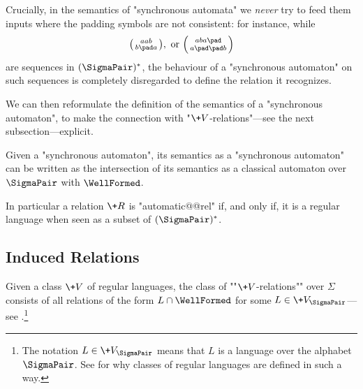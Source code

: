\begin{remark}
	\AP\label{rk:semantic}
	Crucially, in the semantics of "synchronous automata" we \emph{never}
	try to feed them inputs where the padding symbols are not consistent: for instance, while
	\[
		\pair{aab}{b\pad a},
		\text{ or }
		\pair{aba\pad}{a\pad\pad b}	
	\]
	are sequences in $(\SigmaPair)^*$, the behaviour of a "synchronous automaton"
	on such sequences is completely disregarded to define the relation it recognizes. 
\end{remark}

We can then reformulate the definition of the semantics of a "synchronous automaton",
to make the connection with "$\+V$-relations"---see the next subsection---explicit.

\begin{fact}
	\AP\label{fact:synchronous-is-regular}
	Given a "synchronous automaton", its semantics as a "synchronous automaton"
	can be written as the intersection of its semantics as a classical automaton over $\SigmaPair$
	with $\WellFormed$.
\end{fact}

In particular a relation $\+R$ is "automatic@@rel" if, and only if, it is a regular language when seen as a subset of $(\SigmaPair)^*$.

\subsection{Induced Relations}

Given a class $\+V$ of regular languages,
the class of \AP""$\+V$-relations"" over $\Sigma$ consists of all relations
of the form $L \cap \WellFormed$ for some $L \in \+V_{\SigmaPair}$---see .\footnote{The notation $L \in \+V_{\SigmaPair}$ means that $L$ is a language over
the alphabet $\SigmaPair$. See \cite[introduction of \S{}XIII.1]{Pin2022MathematicalFoundations}
for why classes of regular languages are defined in such a way.}

